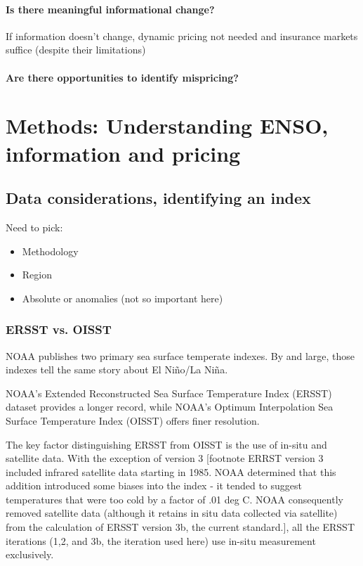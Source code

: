\documentclass[authoryear]{article}
\begin{document}
\paragraph{Is there meaningful informational change?}
If information doesn't change, dynamic pricing not needed and insurance markets suffice (despite their limitations)

\paragraph{Are there opportunities to identify mispricing?}


\section{Methods: Understanding ENSO, information and pricing}

\subsection{Data considerations, identifying an index}
Need to pick:
\begin{itemize}
\item Methodology
\item Region
\item Absolute or anomalies (not so important here)
\end{itemize}

\subsubsection{ERSST vs. OISST}

NOAA publishes two primary sea surface temperate indexes. By and large, those indexes tell the same story about El Ni\~no/La Ni\~na.

NOAA's Extended Reconstructed Sea Surface Temperature Index (ERSST) dataset provides a longer record, while NOAA's Optimum Interpolation Sea Surface Temperature Index (OISST) offers finer resolution. 

The key factor distinguishing ERSST from OISST is the use of in-situ and satellite data. With the exception of version 3 [footnote ERRST version 3 included infrared satellite data starting in 1985. NOAA determined that this addition introduced some biases into the index - it tended to suggest temperatures that were too cold by a factor of .01 deg C. NOAA consequently removed satellite data (although it retains in situ data collected via satellite) from the calculation of ERSST version 3b, the current standard.], all the ERSST iterations (1,2, and 3b, the iteration used here) use in-situ measurement exclusively\cite{smith2004improved}\cite{smith2003extended}\cite{smith2008improvements}.
\end{document}

